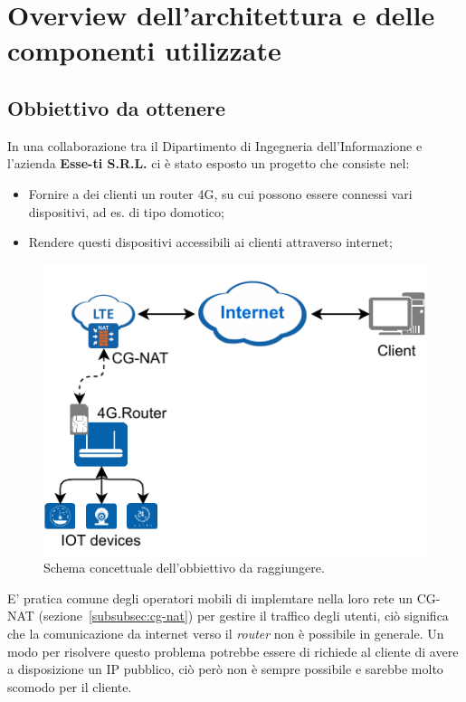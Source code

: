 

\chapter{Overview dell'architettura e delle componenti utilizzate \workinprogress}

\label{ch:overview}

\section{Obbiettivo da ottenere \workinprogress}
\label{sec:overview-goal}

In una collaborazione tra il Dipartimento di Ingegneria dell'Informazione e l'azienda \textbf{Esse-ti S.R.L.} ci è stato esposto un progetto che consiste nel:


\begin{itemize}[nosep, itemsep=0.2em]
	\item Fornire a dei clienti un router 4G, su cui possono essere connessi vari dispositivi, ad es. di tipo domotico;
	\item Rendere questi dispositivi accessibili ai clienti attraverso internet;
\end{itemize}

\begin{figure}[H]
	\centering
	\includegraphics[width=0.5\linewidth]{immagini/diag-goal}
	\caption{Schema concettuale dell'obbiettivo da raggiungere.}
	\label{fig:schema_concettuale}
\end{figure}

E' pratica comune degli operatori mobili di implemtare nella loro rete un CG-NAT (sezione~\ref{subsubsec:cg-nat}) per gestire il traffico degli utenti, ciò significa che la comunicazione da internet verso il \textit{router} non è possibile in generale. Un modo per risolvere questo problema potrebbe essere di richiede al cliente di avere a disposizione un IP pubblico, ciò però non è sempre possibile e sarebbe molto scomodo per il cliente. 

